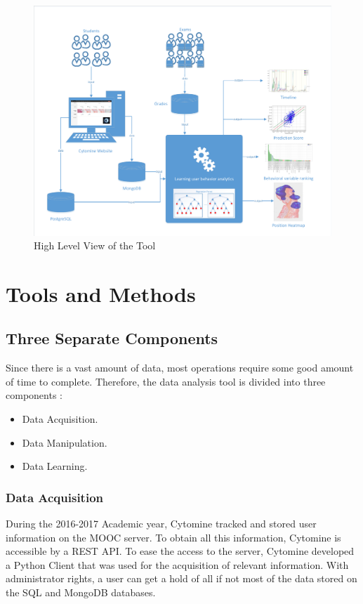 \documentclass[a4paper,11pt]{report}
\numberwithin{figure}{section} %
\begin{document}
      \begin{figure}[H]
      \centering
      \includegraphics[width=.95\linewidth]{highlevel.pdf}
      \caption{High Level View of the Tool}
      \label{fig:highlevel}
      \end{figure}

\section{Tools and Methods}
	
    \subsection{Three Separate Components}
    	Since there is a vast amount of data, most operations require some good amount of time to complete.
    	Therefore, the data analysis tool is divided into three components :
        \begin{itemize}
        \item[\textbullet] Data Acquisition.
        \item[\textbullet] Data Manipulation.
        \item[\textbullet] Data Learning.
        \end{itemize}

		\subsubsection{Data Acquisition}
        
			During the 2016-2017 Academic year, Cytomine tracked and stored user information on the MOOC server.
			To obtain all this information, Cytomine is accessible by a REST API. To ease the access to the server, Cytomine developed a Python Client that was used for the acquisition of relevant information.
			With administrator rights, a user can get a hold of all if not most of the data stored on the SQL and MongoDB databases.
            
\end{document}
